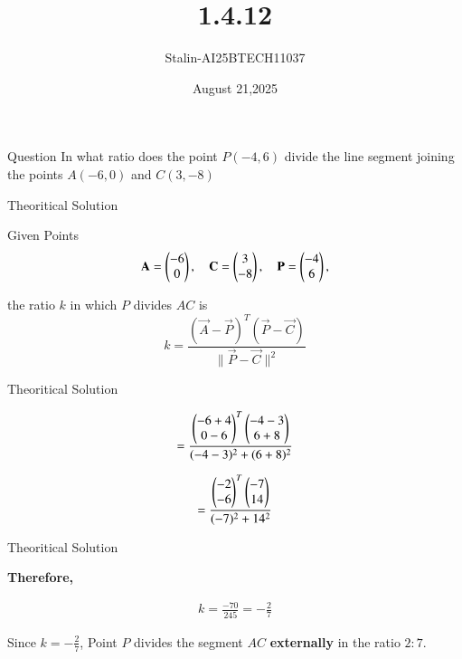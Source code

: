 \documentclass{beamer}
\title %
{1.4.12}
\date{August 21,2025}
\author %
{Stalin-AI25BTECH11037}
\begin{document}
\frame{\titlepage}
\begin{frame}{Question}
In what ratio does the point \( P(-4, 6) \) divide the line segment joining the points \( A(-6, 0) \) and \( C(3, -8) \) 
\end{frame}

\begin{frame}{Theoritical Solution}

Given Points
\begin{align*}
\mathbf{A} = \begin{pmatrix}-6 \\ 0\end{pmatrix}, \quad
\mathbf{C} =  \begin{pmatrix}3 \\ -8\end{pmatrix}, \quad
\mathbf{P} = \begin{pmatrix}-4 \\ 6\end{pmatrix},
\end{align*}

the ratio \( k \) in which \( P \) divides \( AC \) is
\[
k = \frac{(\vec{A} - \vec{P})^T (\vec{P} - \vec{C})}{\|\vec{P} - \vec{C}\|^2}
\]

\end{frame}







\begin{frame}{Theoritical Solution}

\begin{align*}
=\frac{ 
 \begin{pmatrix}-6 + 4 \\ 0 - 6\end{pmatrix}^T
 \begin{pmatrix}-4 - 3 \\ 6 + 8\end{pmatrix}
}{
(-4 - 3)^2 + (6 + 8)^2
}
\end{align*}

\begin{align*}
=\frac{
 \begin{pmatrix}-2 \\ -6\end{pmatrix}^T
 \begin{pmatrix}-7 \\ 14\end{pmatrix}
}{
(-7)^2 + 14^2
}
\end{align*}
\end{frame}




\begin{frame}{Theoritical Solution}

\textbf{Therefore,}

\begin{align*}
k = \frac{-70}{245} = -\frac{2}{7}
\end{align*}


Since \( k = -\frac{2}{7} \), Point \( P \) divides the segment \( AC \) \textbf{externally} in the ratio \( 2 : 7 \).

\end{frame}
\end{document}
